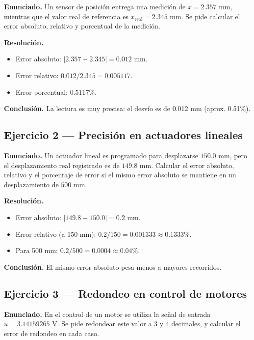 \documentclass[12pt,a4paper]{report}
\begin{document}
	\textbf{Enunciado.} Un sensor de posición entrega una medición de $x=2.357$ mm, mientras que el valor real de referencia es $x_{\text{real}}=2.345$ mm. Se pide calcular el error absoluto, relativo y porcentual de la medición.
	
	\textbf{Resolución.}
	\begin{itemize}
		\item Error absoluto: $|2.357-2.345|=0.012$ mm.
		\item Error relativo: $0.012/2.345=0.005117$.
		\item Error porcentual: $0.5117\%$.
	\end{itemize}
	
	\textbf{Conclusión.} La lectura es muy precisa: el desvío es de 0.012 mm (aprox. 0.51\%).
	
	\subsection*{Ejercicio 2 --- Precisión en actuadores lineales}
	
	\textbf{Enunciado.} Un actuador lineal es programado para desplazarse $150.0$ mm, pero el desplazamiento real registrado es de $149.8$ mm. Calcular el error absoluto, relativo y el porcentaje de error si el mismo error absoluto se mantiene en un desplazamiento de $500$ mm.
	
	\textbf{Resolución.}
	\begin{itemize}
		\item Error absoluto: $|149.8-150.0|=0.2$ mm.
		\item Error relativo (a 150 mm): $0.2/150=0.001333 \approx 0.1333\%$.
		\item Para 500 mm: $0.2/500=0.0004 \approx 0.04\%$.
	\end{itemize}
	
	\textbf{Conclusión.} El mismo error absoluto pesa menos a mayores recorridos.
	
	\subsection*{Ejercicio 3 --- Redondeo en control de motores}
	
	\textbf{Enunciado.} En el control de un motor se utiliza la señal de entrada $u=3.14159265$ V. Se pide redondear este valor a 3 y 4 decimales, y calcular el error de redondeo en cada caso.
	
\end{document}
